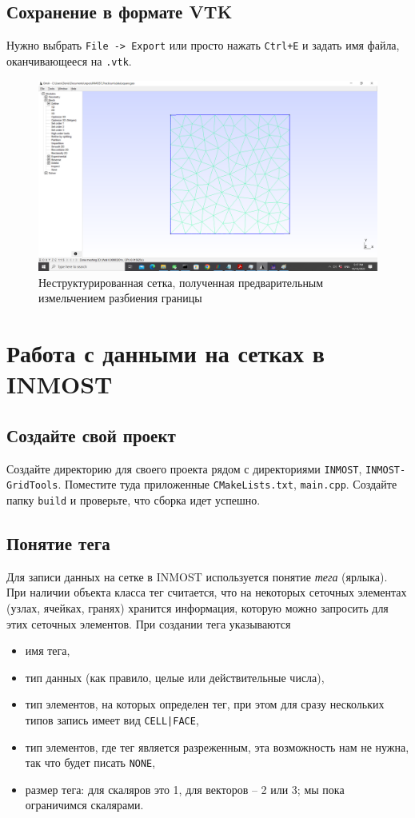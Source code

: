 \documentclass[a4paper, 11pt]{article}
\begin{document}
\subsection{Сохранение в формате VTK}
Нужно выбрать \texttt{File -> Export} или просто нажать \texttt{Ctrl+E} и задать имя файла, оканчивающееся на \texttt{.vtk}.

\begin{figure}[h] \centering
	\includegraphics[scale=0.4]{gmsh_unstr.png}
	\caption{Неструктурированная сетка, полученная предварительным измельчением разбиения границы\label{fig:gmsh_unstr}}
\end{figure}

\section{Работа с данными на сетках в INMOST}

\subsection{Создайте свой проект}
Создайте директорию для своего проекта рядом с директориями \texttt{INMOST}, \texttt{INMOST-GridTools}. Поместите туда приложенные \texttt{CMakeLists.txt}, \texttt{main.cpp}. Создайте папку \texttt{build} и проверьте, что сборка идет успешно.

\subsection{Понятие тега}
Для записи данных на сетке в INMOST используется понятие \textit{тега} (ярлыка). При наличии объекта класса тег считается, что на некоторых сеточных элементах (узлах, ячейках, гранях) хранится информация, которую можно запросить для этих сеточных элементов. При создании тега указываются
\begin{itemize}
	\item имя тега,
	\item тип данных (как правило, целые или действительные числа),
	\item тип элементов, на которых определен тег, при этом для сразу нескольких типов запись имеет вид \texttt{CELL|FACE},
	\item тип элементов, где тег является разреженным, эта возможность нам не нужна, так что будет писать \texttt{NONE},
	\item размер тега: для скаляров это 1, для векторов -- 2 или 3; мы пока ограничимся скалярами.
\end{itemize} 
\end{document}
